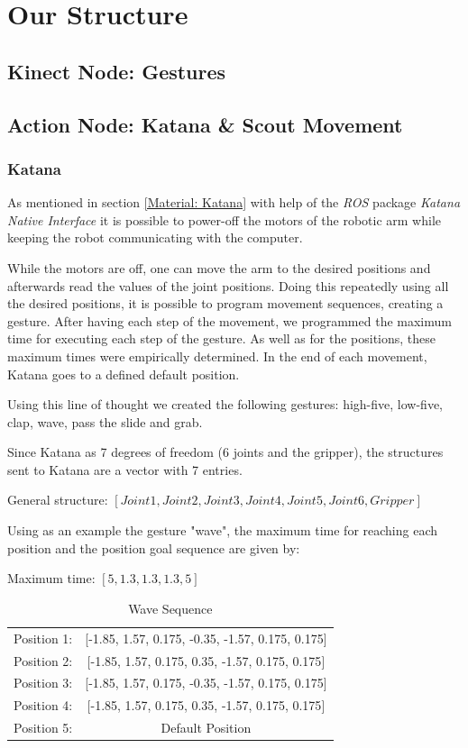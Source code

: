 \section{Our Structure}

\subsection{Kinect Node: Gestures}

\subsection{Action Node: Katana \& Scout Movement}
\subsubsection{Katana}
As mentioned in section \ref{Material: Katana} with help of the \textit{ROS} package \textit{Katana Native Interface} it is possible to power-off the motors of the robotic arm while keeping the robot communicating with the computer.

While the motors are off, one can move the arm to the desired positions and afterwards read the values of the joint positions. Doing this repeatedly using all the desired positions, it is possible to program movement sequences, creating a gesture. After having each step of the movement, we programmed the maximum time for executing each step of the gesture. As well as for the positions, these maximum times were empirically determined. In the end of each movement, Katana goes to a defined default position.

Using this line of thought we created the following gestures: high-five, low-five, clap, wave, pass the slide and grab.

Since Katana as 7 degrees of freedom (6 joints and the gripper), the structures sent to Katana are a vector with 7 entries.
\begin{center}
General structure:
$\left[ Joint1, Joint2, Joint3, Joint4, Joint5, Joint6, Gripper\right]$\\
\end{center}
Using as an example the gesture "wave", the maximum time for reaching each position and the position goal sequence are given by:
\begin{center}
Maximum time:
$\left[5, 1.3, 1.3, 1.3, 5\right]$\\
\end{center}
\begin{table}[!h]
\centering
\begin{tabular}{lc}
Position 1: & {[}-1.85, 1.57, 0.175, -0.35, -1.57, 0.175, 0.175{]} \\
Position 2: & {[}-1.85, 1.57, 0.175, 0.35, -1.57, 0.175, 0.175{]}  \\
Position 3: & {[}-1.85, 1.57, 0.175, -0.35, -1.57, 0.175, 0.175{]} \\
Position 4: & {[}-1.85, 1.57, 0.175, 0.35, -1.57, 0.175, 0.175{]}  \\
Position 5: & Default Position                                    
\end{tabular}
\caption{Wave Sequence}
\label{wave}
\end{table}

